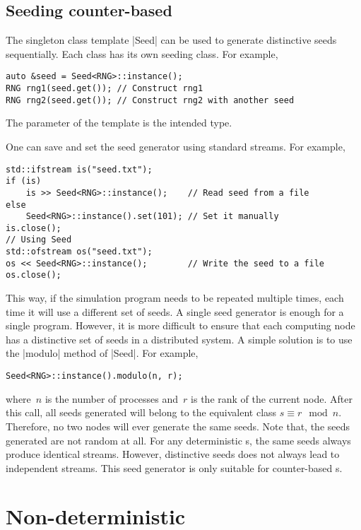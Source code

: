 \subsection{Seeding counter-based \texorpdfstring{\rng}{RNG}}
\label{sub:Seeding counter-based RNG}

The singleton class template |Seed| can be used to generate distinctive seeds
sequentially. Each \rng class has its own seeding class. For example,
\begin{verbatim}
auto &seed = Seed<RNG>::instance();
RNG rng1(seed.get()); // Construct rng1
RNG rng2(seed.get()); // Construct rng2 with another seed
\end{verbatim}
The parameter of the template is the intended \rng type.

One can save and set the seed generator using standard streams. For example,
\begin{verbatim}
std::ifstream is("seed.txt");
if (is)
    is >> Seed<RNG>::instance();    // Read seed from a file
else
    Seed<RNG>::instance().set(101); // Set it manually
is.close();
// Using Seed
std::ofstream os("seed.txt");
os << Seed<RNG>::instance();        // Write the seed to a file
os.close();
\end{verbatim}
This way, if the simulation program needs to be repeated multiple times, each
time it will use a different set of seeds. A single seed generator is enough
for a single program. However, it is more difficult to ensure that each
computing node has a distinctive set of seeds in a distributed system. A simple
solution is to use the |modulo| method of |Seed|. For example,
\begin{verbatim}
Seed<RNG>::instance().modulo(n, r);
\end{verbatim}
where~$n$ is the number of processes and~$r$ is the rank of the current node.
After this call, all seeds generated will belong to the equivalent class $s
\equiv r \mod n$. Therefore, no two nodes will ever generate the same seeds.
Note that, the seeds generated are not random at all. For any deterministic
\rng{}s, the same seeds always produce identical streams. However, distinctive
seeds does not always lead to independent streams. This seed generator is only
suitable for counter-based \rng{}s.

\section{Non-deterministic \texorpdfstring{\rng}{RNG}}
\label{sec:Non-deterministic RNG}


